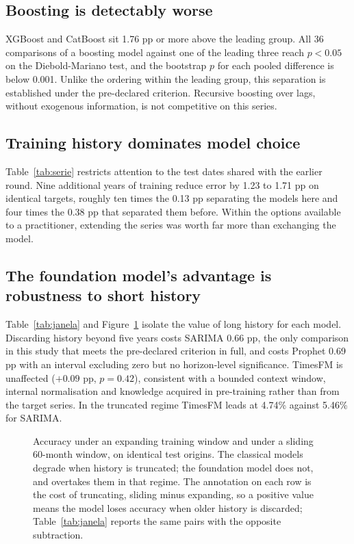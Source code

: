 \subsection{Boosting is detectably worse}

XGBoost and CatBoost sit 1.76 pp or more above the leading group. All 36 comparisons of a
boosting model against one of the leading three reach $p<0.05$ on the Diebold-Mariano test,
and the bootstrap $p$ for each pooled difference is below 0.001. Unlike the ordering within
the leading group, this separation is established under the pre-declared criterion.
Recursive boosting over lags, without exogenous information, is not competitive on this
series.

\subsection{Training history dominates model choice}



Table~\ref{tab:serie} restricts attention to the test dates shared with the earlier round.
Nine additional years of training reduce error by 1.23 to 1.71 pp on identical targets,
roughly ten times the 0.13 pp separating the models here and four times the 0.38 pp that
separated them before. Within the options available to a practitioner, extending the series
was worth far more than exchanging the model.

\subsection{The foundation model's advantage is robustness to short history}



Table~\ref{tab:janela} and Figure~\ref{fig:janela} isolate the value of long history for
each model. Discarding history beyond five years costs SARIMA 0.66 pp, the only comparison
in this study that meets the pre-declared criterion in full, and costs Prophet 0.69 pp with
an interval excluding zero but no horizon-level significance. TimesFM is unaffected
($+0.09$ pp, $p=0.42$), consistent with a bounded context window, internal normalisation
and knowledge acquired in pre-training rather than from the target series. In the truncated
regime TimesFM leads at 4.74\% against 5.46\% for SARIMA.

\begin{figure}[htbp]
\centering

\caption{Accuracy under an expanding training window and under a sliding 60-month window,
on identical test origins. The classical models degrade when history is truncated; the
foundation model does not, and overtakes them in that regime. The annotation on each row
is the cost of truncating, sliding minus expanding, so a positive value means the model
loses accuracy when older history is discarded; Table~\ref{tab:janela} reports the same
pairs with the opposite subtraction.}
\label{fig:janela}
\end{figure}

